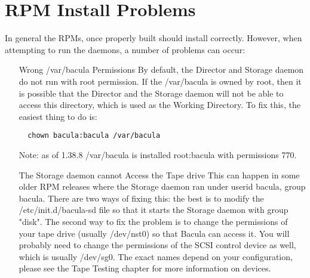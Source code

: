 \section{RPM Install Problems}
In general the RPMs, once properly built should install correctly.
However, when attempting to run the daemons, a number of problems
can occur:
\begin{itemize}
\item [Wrong /var/bacula Permissions]
  By default, the Director and Storage daemon do not run with
  root permission. If the /var/bacula is owned by root, then it
  is possible that the Director and the Storage daemon will not
  be able to access this directory, which is used as the Working
  Directory. To fix this, the easiest thing to do is:
\begin{verbatim}
  chown bacula:bacula /var/bacula
\end{verbatim}
  Note: as of 1.38.8 /var/bacula is installed root:bacula with
  permissions 770.
\item [The Storage daemon cannot Access the Tape drive]
  This can happen in some older RPM releases where the Storage
  daemon ran under userid bacula, group bacula.  There are two
  ways of fixing this: the best is to modify the /etc/init.d/bacula-sd
  file so that it starts the Storage daemon with group "disk".
  The second way to fix the problem is to change the permissions
  of your tape drive (usually /dev/nst0) so that Bacula can access it.
  You will probably need to change the permissions of the SCSI control
  device as well, which is usually /dev/sg0.  The exact names depend
  on your configuration, please see the Tape Testing chapter for
  more information on devices.
\end{itemize}
